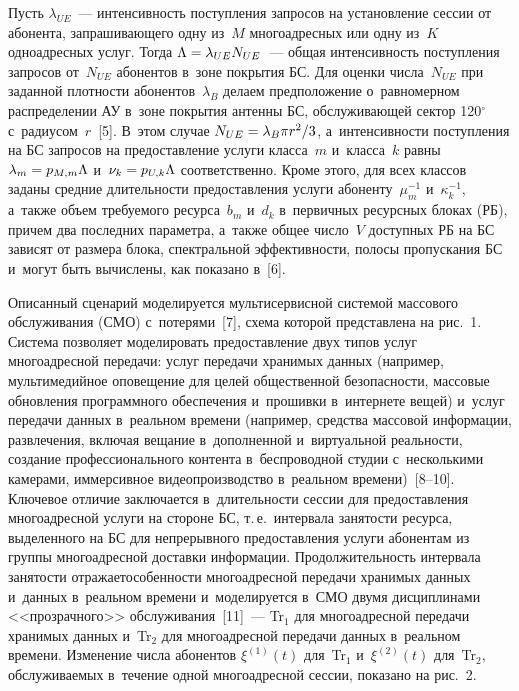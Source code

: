 \begin{multicols}{2}
  Пусть $\lambda_{UE}$~--- интенсивность поступления запросов на 
установление сессии от абонента, запрашивающего одну из~$M$ 
многоадресных или одну из~$K$ одноадресных услуг. Тогда $\Lambda\hm= 
\lambda_{UE}N_{UE}$~--- общая ин\-тен\-сив\-ность по\-ступ\-ле\-ния запросов 
от~$N_{UE}$ абонентов в~зоне покрытия БС. Для оценки числа~$N_{UE}$ при 
заданной плот\-ности абонентов~$\lambda_B$ делаем предположение 
о~равномерном распределении АУ в~зоне покрытия антенны БС, 
об\-слу\-жи\-ва\-ющей сектор 120$^\circ$ с~радиусом~$r$~[5]. В~этом случае 
$N_{UE}\hm= \lambda_B \pi r^2/3$, а~интенсивности по\-ступ\-ле\-ния на БС 
запросов на предостав\-ле\-ние услуги класса~$m$ и~класса~$k$ равны 
$\lambda_m\hm= p_{M,m}\Lambda$ и~$\nu_k\hm= p_{U,k}\Lambda$ 
соответственно. Кроме этого, для всех классов заданы сред\-ние длительности 
предостав\-ле\-ния услуги абоненту~$\mu_m^{-1}$ и~$\kappa_k^{-1}$, а~так\-же 
объем требуемого ресурса~$b_m$ и~$d_k$ в~первичных ресурсных блоках (РБ), причем два 
последних па\-ра\-мет\-ра, а~так\-же общее чис\-ло~$V$ доступных РБ 
на БС зависят от размера блока, спект\-раль\-ной эф\-фек\-тив\-ности, полосы 
пропускания БС и~могут быть вы\-чис\-ле\-ны, как показано в~[6].


  Описанный сценарий моделируется мультисервисной сис\-те\-мой массового 
обслуживания (СМО) с~потерями~[7], схема которой пред\-став\-ле\-на на рис.~1. Сис\-те\-ма 
поз\-во\-ля\-ет моделировать предостав\-ле\-ние двух типов услуг многоадресной 
передачи: услуг передачи хранимых данных (например, мультимедийное 
оповещение для целей общественной безопас\-ности, массовые обновления 
программного обеспечения и~про\-шив\-ки в~интернете вещей) и~услуг \mbox{передачи} 
данных в~реальном времени (например, средства массовой информации, 
развлечения, включая вещание в~дополненной и~виртуальной ре\-аль\-ности, 
создание профессионального \mbox{контента} в~беспроводной студии с~несколькими 
камерами, иммерсивное видеопроизводство в~реальном времени)~[8--10]. 
Ключевое отличие заключается в~дли\-тель\-ности сессии для предостав\-ле\-ния 
многоадресной услуги на стороне БС, т.\,е.\ \mbox{интервала} за\-ня\-тости ресурса, 
выделенного на БС для непрерывного предостав\-ле\-ния услуги абонентам из 
группы многоадресной до\-став\-ки информации. Про\-дол\-жи\-тель\-ность интервала 
за\-ня\-тости отражает\linebreak особенности многоадресной передачи хранимых данных 
и~данных в~реальном времени и~моделируется в~СМО двумя дис\-цип\-ли\-на\-ми 
<<прозрачного>> обслуживания~[11]~--- Tr$_1$ для многоадресной передачи 
хранимых данных и~Tr$_2$ для многоадресной передачи данных в~реальном 
времени. Изменение чис\-ла абонентов $\xi^{(1)}(t)$ для~Tr$_1$ и~$\xi^{(2)}(t)$ 
для~Tr$_2$, об\-слу\-жи\-ва\-емых в~течение одной многоадресной сессии, показано 
на рис.~2.





\end{multicols}
